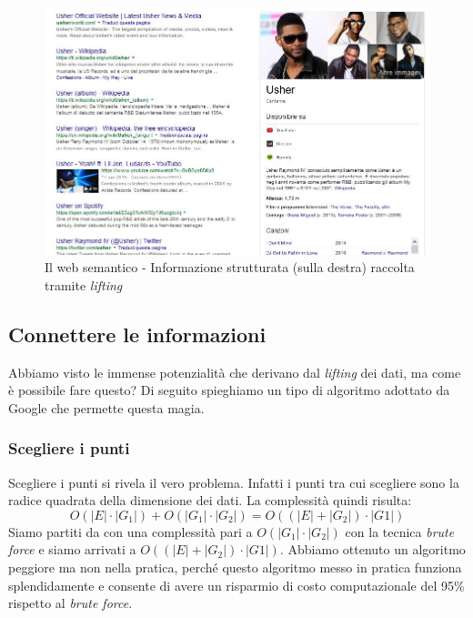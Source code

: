 			\begin{figure} [h]
				\centering
				\includegraphics[width=\textwidth]{images/LInformazioneEIlWebSemantico-IlCasoUsher}
				\caption{Il web semantico - Informazione strutturata (sulla destra) raccolta tramite \emph{lifting}}
				\label{fig:LInformazioneEIlWebSemantico-IlCasoUsher}
			\end{figure}
			
		
		\subsection{Connettere le informazioni}
			Abbiamo visto le immense potenzialità che derivano dal \emph{lifting} dei dati, ma come è possibile fare questo? Di seguito spieghiamo un tipo di algoritmo adottato da Google che permette questa magia.
		
			\subsubsection{Scegliere i punti}
				Scegliere i punti si rivela il vero problema. Infatti i punti tra cui scegliere sono la radice quadrata della dimensione dei dati. La complessità quindi risulta:
				\[
					O(|E| \cdot |G_1|) + O(|G_1| \cdot |G_2|) = O((|E| + |G_2|) \cdot |G1|)
				\]
				Siamo partiti da con una complessità pari a $O(|G_1|\cdot|G_2|)$ con la tecnica \emph{brute force} e siamo arrivati a $O((|E| + |G_2|) \cdot |G1|)$. Abbiamo ottenuto un algoritmo peggiore ma non nella pratica, perché questo algoritmo messo in pratica funziona splendidamente e consente di avere un risparmio di costo computazionale del 95\% rispetto al \emph{brute force}.
			
